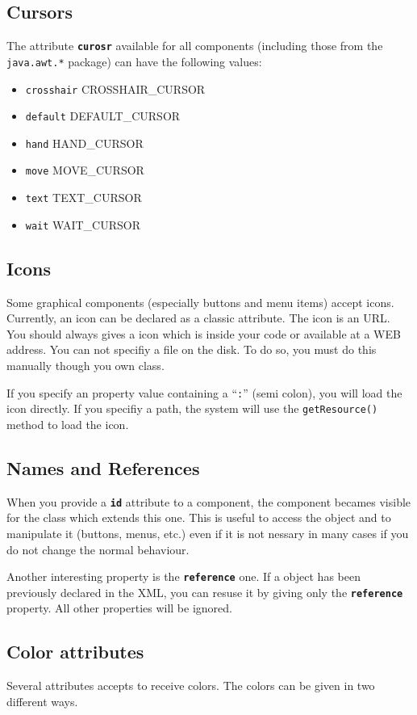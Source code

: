 \documentclass[a4paper,onecolumn,10pt]{book}
\newcommand{\jmethod}[1]{\texttt{\small #1()}}
\newcommand{\jclass}[1]{\texttt{\small #1}}
\newcommand{\attr}[1]{\texttt{\small \textbf{#1}}}
\begin{document}
\subsection{\label{sec:cursors}Cursors}
The attribute \attr{curosr} available for all components (including those
from the \jclass{java.awt.*} package) can have the following values:
\begin{itemize}
	\item \verb|crosshair| CROSSHAIR\_CURSOR
	\item \verb|default| DEFAULT\_CURSOR
	\item \verb|hand| HAND\_CURSOR
	\item \verb|move| MOVE\_CURSOR
	\item \verb|text| TEXT\_CURSOR
	\item \verb|wait| WAIT\_CURSOR
\end{itemize}

\subsection{Icons}
Some graphical components (especially buttons and menu items) accept icons.
Currently, an icon can be declared as a classic attribute. The icon is an
URL. You should always gives a icon which is inside your code or available
at a WEB address. You can not specifiy a file on the disk. To do so, you must
do this manually though you own class.

If you specify an property value containing a ``\verb|:|'' (semi colon), you
will load the icon directly. If you specifiy a path, the system will use the
\jmethod{getResource} method to load the icon.

\subsection{Names and References}
When you provide a \attr{id} attribute to a component, the component becames
visible for the class which extends this one. This is useful to access the
object and to manipulate it (buttons, menus, etc.) even if it is not nessary
in many cases if you do not change the normal behaviour.
 

Another interesting property is the \attr{reference} one. If a object has been
previously declared in the XML, you can resuse it by giving only the
\attr{reference} property. All other properties will be ignored.

\subsection{Color attributes}
Several attributes accepts to receive colors. The colors can be
given in two different ways.
\end{document}
